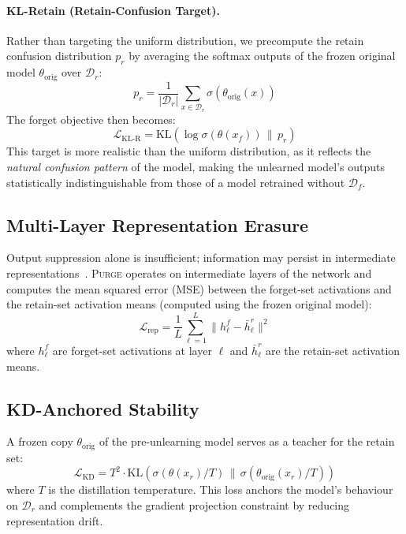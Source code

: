 \documentclass[10pt,twocolumn]{article}
\newcommand{\ours}{\textsc{Purge}}
\begin{document}
\paragraph{KL-Retain (Retain-Confusion Target).}
Rather than targeting the uniform distribution, we precompute the retain confusion distribution $p_r$ by averaging the softmax outputs of the frozen original model $\theta_{\text{orig}}$ over $\mathcal{D}_r$:
\begin{equation}\label{eq:retain_confuse}
p_r = \frac{1}{|\mathcal{D}_r|}\sum_{x \in \mathcal{D}_r} \sigma(\theta_{\text{orig}}(x))
\end{equation}
The forget objective then becomes:
\begin{equation}
\mathcal{L}_{\text{KL-R}} = \text{KL}\!\left(\log\sigma(\theta(x_f)) \,\|\, p_r\right)
\end{equation}
This target is more realistic than the uniform distribution, as it reflects the \emph{natural confusion pattern} of the model, making the unlearned model's outputs statistically indistinguishable from those of a model retrained without $\mathcal{D}_f$.

\subsection{Multi-Layer Representation Erasure}

Output suppression alone is insufficient; information may persist in intermediate representations~\cite{golatkar2020eternal}.
\ours{} operates on intermediate layers of the network and computes the mean squared error (MSE) between the forget-set activations and the retain-set activation means (computed using the frozen original model):
\begin{equation}
\mathcal{L}_{\text{rep}} = \frac{1}{L}\sum_{\ell=1}^{L} \|h_\ell^f - \bar{h}_\ell^r\|^2
\end{equation}
where $h_\ell^f$ are forget-set activations at layer $\ell$ and $\bar{h}_\ell^r$ are the retain-set activation means.

\subsection{KD-Anchored Stability}

A frozen copy $\theta_{\text{orig}}$ of the pre-unlearning model serves as a teacher for the retain set:
\begin{equation}
\mathcal{L}_{\text{KD}} = T^2 \cdot \text{KL}\!\left(\sigma(\theta(x_r)/T) \,\|\, \sigma(\theta_{\text{orig}}(x_r)/T)\right)
\end{equation}
where $T$ is the distillation temperature.
This loss anchors the model's behaviour on $\mathcal{D}_r$ and complements the gradient projection constraint by reducing representation drift.
\end{document}
